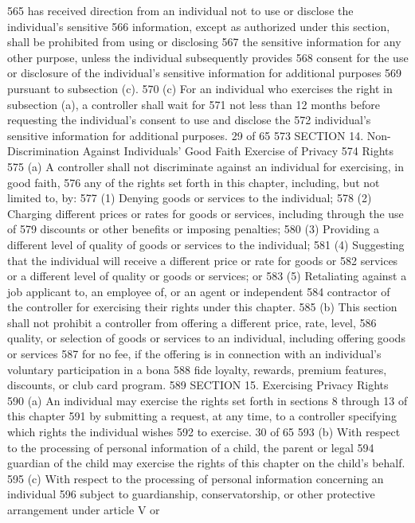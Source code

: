 565 has received direction from an individual not to use or disclose the individual’s sensitive
566 information, except as authorized under this section, shall be prohibited from using or disclosing
567 the sensitive information for any other purpose, unless the individual subsequently provides
568 consent for the use or disclosure of the individual’s sensitive information for additional purposes
569 pursuant to subsection (c).
570 (c) For an individual who exercises the right in subsection (a), a controller shall wait for
571 not less than 12 months before requesting the individual’s consent to use and disclose the
572 individual’s sensitive information for additional purposes.
29 of 65
573 SECTION 14. Non-Discrimination Against Individuals’ Good Faith Exercise of Privacy
574 Rights
575 (a) A controller shall not discriminate against an individual for exercising, in good faith,
576 any of the rights set forth in this chapter, including, but not limited to, by:
577 (1) Denying goods or services to the individual;
578 (2) Charging different prices or rates for goods or services, including through the use of
579 discounts or other benefits or imposing penalties;
580 (3) Providing a different level of quality of goods or services to the individual;
581 (4) Suggesting that the individual will receive a different price or rate for goods or
582 services or a different level of quality or goods or services; or
583 (5) Retaliating against a job applicant to, an employee of, or an agent or independent
584 contractor of the controller for exercising their rights under this chapter.
585 (b) This section shall not prohibit a controller from offering a different price, rate, level,
586 quality, or selection of goods or services to an individual, including offering goods or services
587 for no fee, if the offering is in connection with an individual’s voluntary participation in a bona
588 fide loyalty, rewards, premium features, discounts, or club card program.
589 SECTION 15. Exercising Privacy Rights
590 (a) An individual may exercise the rights set forth in sections 8 through 13 of this chapter
591 by submitting a request, at any time, to a controller specifying which rights the individual wishes
592 to exercise.
30 of 65
593 (b) With respect to the processing of personal information of a child, the parent or legal
594 guardian of the child may exercise the rights of this chapter on the child’s behalf.
595 (c) With respect to the processing of personal information concerning an individual
596 subject to guardianship, conservatorship, or other protective arrangement under article V or
